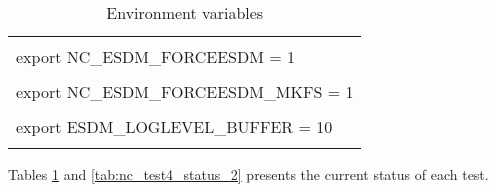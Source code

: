 \begin{table}[H]
\centering
\begin{tabular}{|l|}
\hline \\
export NC\_ESDM\_FORCEESDM = 1\\ \\
export NC\_ESDM\_FORCEESDM\_MKFS = 1\\ \\
export ESDM\_LOGLEVEL\_BUFFER = 10\\ \\ \hline
\end{tabular}
\caption{\label{tab:nc_test4_status_1} Environment variables}
\end{table}

Tables \ref{tab:nc_test4_status_1} and \ref{tab:nc_test4_status_2} presents the current status of each test.

